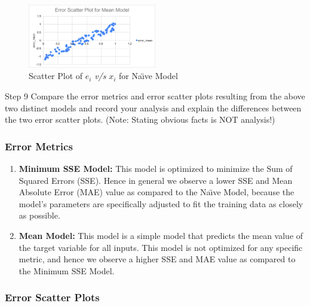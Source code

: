 \begin{figure}[H]
	\centering
	\includegraphics[width=0.5\textwidth]{Images/error2.png}
	\caption{Scatter Plot of $e_i$ \textit{v/s} $x_i$ for Na\"{\i}ve Model}
\end{figure}

\begin{custombox}[label={box:step9}] {Step 9}
	Compare the error metrics and error scatter plots resulting from the above two distinct models and record your analysis and explain the differences between the two error scatter plots. (Note: Stating obvious facts is NOT analysis!)
\end{custombox}

\setcounter{subsection}{9}

\subsubsection{Error Metrics}

\begin{enumerate}
	\item \textbf{Minimum SSE Model:} This model is optimized to minimize the Sum of Squared Errors (SSE). Hence in general we observe a lower SSE and Mean Absolute Error (MAE) value as compared to the Na\"{\i}ve Model, because the model's parameters are specifically adjusted to fit the training data as closely as possible.
	\item \textbf{Mean Model:} This model is a simple model that predicts the mean value of the target variable for all inputs. This model is not optimized for any specific metric, and hence we observe a higher SSE and MAE value as compared to the Minimum SSE Model.
\end{enumerate}

\subsubsection{Error Scatter Plots}

